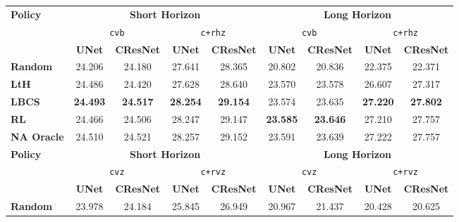 \begin{tabular}{lcccc|cccc}
\toprule
\multirow{3}{*}{\textbf{Policy}} & \multicolumn{4}{c|}{\textbf{Short Horizon}} & \multicolumn{4}{c}{\textbf{Long Horizon}} \\
\cmidrule(l){2-5}\cmidrule(l){6-9}
 & \multicolumn{2}{c}{\texttt{cvb}} & \multicolumn{2}{c|}{\texttt{c+rhz}} & \multicolumn{2}{c}{\texttt{cvb}} & \multicolumn{2}{c}{\texttt{c+rhz}} \\
  \cmidrule(l){2-3}\cmidrule(l){4-5}\cmidrule(l){6-7}\cmidrule(l){8-9}
 & \multicolumn{1}{c}{\textbf{UNet}} & \multicolumn{1}{c}{\textbf{CResNet}} & \multicolumn{1}{c}{\textbf{UNet}} & \multicolumn{1}{c|}{\textbf{CResNet}} & \multicolumn{1}{c}{\textbf{UNet}} & \multicolumn{1}{c}{\textbf{CResNet}} & \multicolumn{1}{c}{\textbf{UNet}} & \multicolumn{1}{c}{\textbf{CResNet}} \\
\midrule
\textbf{Random}    & {24.206}            & {24.180}  & {27.641} & {28.365}  &  20.802 & 20.836 &22.375& 22.371\\
\textbf{LtH}         & {24.486}            & 24.420         & 27.628      & 28.640   & 23.570   & 23.578&26.607 &27.317      \\
\textbf{LBCS}        &\textbf{24.493}            & \textbf{24.517}           & \textbf{28.254} & \textbf{29.154} & 23.574& {23.635}&\textbf{27.220} &\textbf{27.802} \\
\textbf{RL }         & {24.466}            & {24.506}   & {28.247} & 29.147 &\textbf{23.585} & \textbf{23.646} &{27.210}&{27.757} \\
\midrule
\textbf{NA Oracle}          & 24.510 & {24.521}  &28.257         & 29.152& 23.591 & 23.639  &27.222 &27.757\\[2mm]
\bottomrule
\toprule
\multirow{3}{*}{\textbf{Policy}} & \multicolumn{4}{c|}{\textbf{Short Horizon}} & \multicolumn{4}{c}{\textbf{Long Horizon}} \\
\cmidrule(l){2-5}\cmidrule(l){6-9}
 & \multicolumn{2}{c}{\texttt{cvz}} & \multicolumn{2}{c|}{\texttt{c+rvz}} & \multicolumn{2}{c}{\texttt{cvz}} & \multicolumn{2}{c}{\texttt{c+rvz}} \\
 \cmidrule(l){2-3}\cmidrule(l){4-5}\cmidrule(l){6-7}\cmidrule(l){8-9}
 & \multicolumn{1}{c}{\textbf{UNet}} & \multicolumn{1}{c}{\textbf{CResNet}} & \multicolumn{1}{c}{\textbf{UNet}} & \multicolumn{1}{c|}{\textbf{CResNet}} & \multicolumn{1}{c}{\textbf{UNet}} & \multicolumn{1}{c}{\textbf{CResNet}} & \multicolumn{1}{c}{\textbf{UNet}} & \multicolumn{1}{c}{\textbf{CResNet}} \\
 \midrule
\textbf{Random } & {23.978} & 24.184 & 25.845 & 26.949 & 20.967 & 21.437 & 20.428 & 20.625 \\

\end{tabular}
